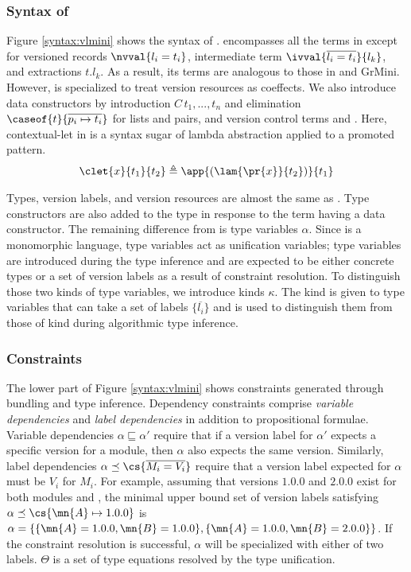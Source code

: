 \subsubsection{Syntax of \vlmini{}}

Figure \ref{syntax:vlmini} shows the syntax of \vlmini{}.
\vlmini{} encompasses all the terms in \corelang{} except for versioned records $\nvval{l_i=t_i}$, intermediate term $\ivval{\overline{l_i=t_i}}{l_k}$, and extractions $t.l_k$. As a result, its terms are analogous to those in \lrpcf{}\cite{brunel_core_2014} and GrMini\cite{Orchard:2019:Granule}. However, \vlmini{} is specialized to treat version resources as coeffects.
We also introduce data constructors by introduction $C\,t_1,...,t_n$ and elimination $\caseof{t}{\overline{p_i \mapsto t_i}}$ for lists and pairs, and version control terms  and . 
Here, contextual-let in \corelang{} is a syntax sugar of lambda abstraction applied to a promoted pattern.
\begin{align*}
\clet{x}{t_1}{t_2} \triangleq \app{(\lam{\pr{x}}{t_2})}{t_1}
\end{align*}

Types, version labels, and version resources are almost the same as \corelang{}.
Type constructors are also added to the type in response to the \vlmini{} term having a data constructor.
The remaining difference from \corelang{} is type variables $\alpha$. Since \vlmini{} is a monomorphic language, type variables act as unification variables; type variables are introduced during the type inference and are expected to be either concrete types or a set of version labels as a result of constraint resolution.
To distinguish those two kinds of type variables, we introduce kinds $\kappa$.
The kind  is given to type variables that can take a set of labels $\{\overline{l_i}\}$ and is used to distinguish them from those of kind \typekind{} during algorithmic type inference.

\subsubsection{Constraints}
% 
The lower part of Figure \ref{syntax:vlmini} shows constraints generated through bundling and type inference.
Dependency constraints comprise \emph{variable dependencies} and \emph{label dependencies} in addition to propositional formulae.
Variable dependencies $\alpha \sqsubseteq \alpha'$ require that if a version label for $\alpha'$ expects a specific version for a module, then $\alpha$ also expects the same version.
Similarly, label dependencies $\alpha \preceq \cs{\overline{M_i = V_i}}$ require that a version label expected for $\alpha$ must be $V_i$ for $M_i$. For example, assuming that versions $1.0.0$ and $2.0.0$ exist for both modules  and , the minimal upper bound set of version labels satisfying $\alpha \preceq \cs{\mn{A}\mapsto 1.0.0}$ is $\alpha = \{\{\mn{A}=1.0.0,\mn{B}=1.0.0\},\{\mn{A}=1.0.0,\mn{B}=2.0.0\}\}$. If the constraint resolution is successful, $\alpha$ will be specialized with either of two labels.
$\Theta$ is a set of type equations resolved by the type unification.

